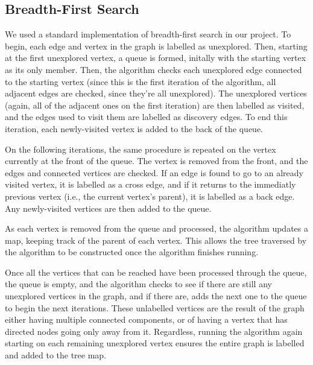 \documentclass[titlepage]{article}
\begin{document}
\begin{multicols*}{2}
            \subsection{Breadth-First Search}
                We used a standard implementation of breadth-first search in our project. To begin, each edge and vertex in the graph is labelled as unexplored. Then, starting at the first unexplored vertex, a queue is formed, initally with the starting vertex as its only member. Then, the algorithm checks each unexplored edge connected to the starting vertex (since this is the first iteration of the algorithm, all adjacent edges are checked, since they're all unexplored). The unexplored vertices (again, all of the adjacent ones on the first iteration) are then labelled as visited, and the edges used to visit them are labelled as discovery edges. To end this iteration, each newly-visited vertex is added to the back of the queue. \par
                On the following iterations, the same procedure is repeated on the vertex currently at the front of the queue. The vertex is removed from the front, and the edges and connected vertices are checked. If an edge is found to go to an already visited vertex, it is labelled as a cross edge, and if it returns to the immediatly previous vertex (i.e., the current vertex's parent), it is labelled as a back edge. Any newly-visited vertices are then added to the queue. \par
                As each vertex is removed from the queue and processed, the algorithm updates a map, keeping track of the parent of each vertex. This allows the tree traversed by the algorithm to be constructed once the algorithm finishes running. \par
                Once all the vertices that can be reached have been processed through the queue, the queue is empty, and the algorithm checks to see if there are still any unexplored vertices in the graph, and if there are, adds the next one to the queue to begin the next iterations. These unlabelled vertices are the result of the graph either having multiple connected components, or of having a vertex that has directed nodes going only away from it. Regardless, running the algorithm again starting on each remaining unexplored vertex ensures the entire graph is labelled and added to the tree map.


\end{multicols*}
\end{document}
